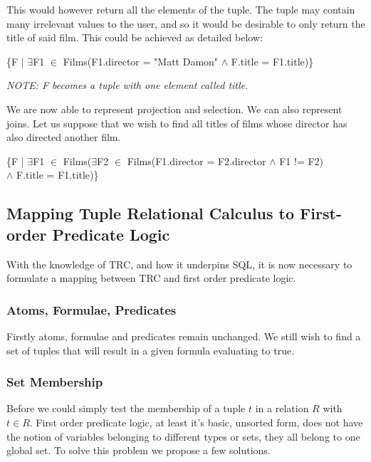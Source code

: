 \documentclass[a4paper, 11pt]{article}
\begin{document}
      This would however return all the elements of the tuple. The tuple may
      contain many irrelevant values to the user, and so it would be desirable
      to only return the title of said film. This could be achieved as detailed
      below:

      \begin{center}
        \{F | $\exists$F1 $\in$ Films(F1.director = "Matt Damon" $\land$ 
          F.title = F1.title)\}
      
        \emph{NOTE: F becomes a tuple with one element called title.}
      \end{center}

      We are now able to represent projection and selection. We can also
      represent joins. Let us suppose that we wish to find all titles of films
      whose director has also directed another film.

      \begin{center}
        \{F | $\exists$F1 $\in$ Films($\exists$F2 $\in$ 
        Films(F1.director = F2.director $\land$ F1 != F2)
        \\ $\land$ F.title = F1.title)\}
      \end{center}

\subsection{Mapping Tuple Relational Calculus to First-order Predicate Logic}
    With the knowledge of TRC, and how it underpins SQL, it is now necessary to
    formulate a mapping between TRC and first order predicate logic.

    \subsubsection{Atoms, Formulae, Predicates}
      Firstly atoms, formulae and predicates remain unchanged. We still wish to
      find a set of tuples that will result in a given formula evaluating to
      true.

    \subsubsection{Set Membership}
      Before we could simply test the membership of a tuple $t$ in a
      relation $R$ with $t \in R$. First order predicate logic, at least it's basic,
      unsorted form, does not have the notion of variables belonging to
      different types or sets, they all belong to one global set. To solve
      this problem we propose a few solutions.
\end{document}
